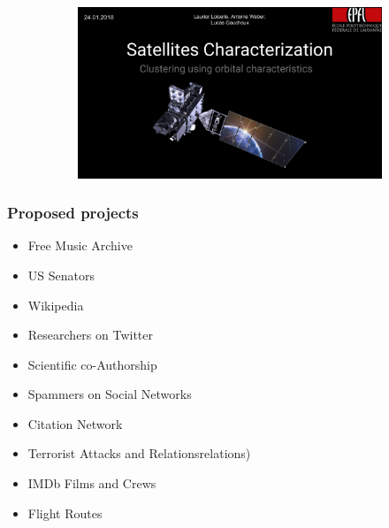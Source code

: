 \documentclass[aspectratio=169]{beamer}
\begin{document}
\begin{frame}
\begin{figure}
\begin{subfigure}[b]{0.47\linewidth}
		\end{subfigure}
		\hfill
		\begin{subfigure}[b]{0.47\linewidth}
			\includegraphics[width=\linewidth]{project2017_satellites}
		\end{subfigure}
	\end{figure}
\end{frame}


\begin{frame}
	\frametitle{Proposed projects}
	\begin{itemize}
		\item Free Music Archive
		\vfill
		\item US Senators
		\vfill
		\item Wikipedia
		\vfill
		\item Researchers on Twitter
		\vfill
		\item Scientific co-Authorship
		\vfill
		\item Spammers on Social Networks
		\vfill
		\item Citation Network
		\vfill
		\item Terrorist Attacks and Relationsrelations)
		\vfill
		\item IMDb Films and Crews
		\vfill
		\item Flight Routes
	\end{itemize}
\end{frame}

\end{document}
